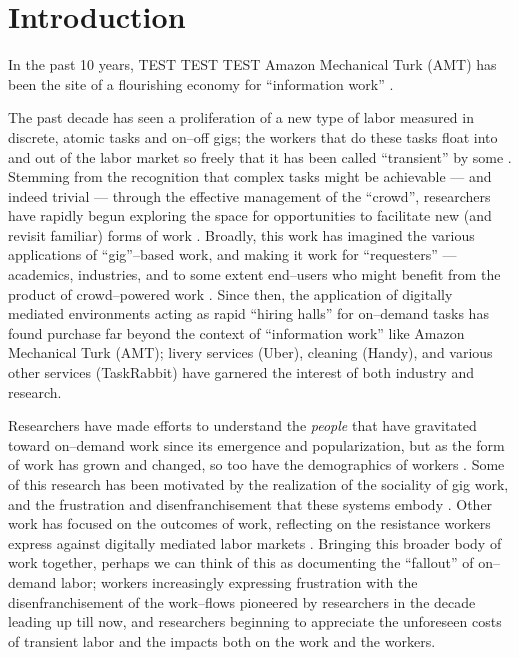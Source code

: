 \documentclass[trackingWork]{subfiles}
\begin{document}
\section{Introduction}
In the past 10 years, TEST TEST TEST
Amazon Mechanical Turk (AMT) has been the site of a flourishing economy for ``information work''
\cite{paolacci2010running}.

The past decade has seen a proliferation of a new type of labor measured in discrete, atomic tasks and on--off gigs;
the workers that do these tasks float into and out of the labor market so freely that it has been called ``transient''
by some
.
Stemming from the recognition that
complex tasks might be achievable
--- and indeed trivial ---
through the effective management of the ``crowd'',
researchers have rapidly begun exploring
the space for opportunities to facilitate new (and revisit familiar) forms of work
\cite{bernsteinSoylent,redballoon}.
Broadly, this work has imagined the various applications of ``gig''--based work,
and making it work for ``requesters''
--- academics, industries, and to some extent end--users
who might benefit from the product of crowd--powered work
\cite{hong2015group,jonBrelig,paolacci2010running}.
Since then,
the application of digitally mediated environments acting as rapid ``hiring halls''
for on--demand tasks
has found purchase far beyond the context of ``information work'' like Amazon Mechanical Turk (AMT);
livery services (Uber), cleaning (Handy), and various other services (TaskRabbit)
have garnered the interest of both industry and research.

Researchers have made efforts to understand the \textit{people} that have gravitated toward on--demand work
since its emergence and popularization,
but as the form of work has grown and changed, so too have the demographics of workers
\cite{Ross,whoareNOTtheTurkers}.
Some of this research has been motivated by the realization of the sociality of gig work,
and the frustration and disenfranchisement that these systems embody
\cite{turkopticon,dynamo}.
Other work has focused on the outcomes of work,
reflecting on the resistance workers express against digitally mediated labor markets
\cite{uberAlgorithm}.
Bringing this broader body of work together, perhaps we can think of this as documenting the ``fallout'' of on--demand labor;
workers increasingly expressing frustration with the disenfranchisement of the work--flows pioneered by researchers in the decade leading up till now,
and researchers beginning to appreciate the unforeseen costs of transient labor and the impacts both on the work and the workers.
\end{document}
